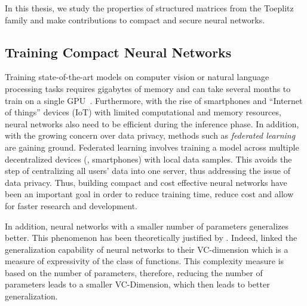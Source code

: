 In this thesis, we study the properties of structured matrices from the Toeplitz family and make contributions to compact and secure neural networks.

\subsection{Training Compact Neural Networks}
\label{subsection:ch1-training_compact_neural_networks}

Training state-of-the-art models on computer vision or natural language processing tasks requires gigabytes of memory and can take several months to train on a single GPU~\cite{krizhevsky2012imagenet,brown2020language}.
Furthermore, with the rise of smartphones and ``Internet of things'' devices (IoT) with limited computational and memory resources, neural networks also need to be efficient during the inference phase.
In addition, with the growing concern over data privacy, methods such as \emph{federated learning} are gaining ground.
Federated learning involves training a model across multiple decentralized devices (\eg, smartphones) with local data samples. 
This avoids the step of centralizing all users' data into one server, thus addressing the issue of data privacy.  
Thus, building compact and cost effective neural networks have been an important goal in order to reduce training time, reduce cost and allow for faster research and development.



In addition, neural networks with a smaller number of parameters generalizes better. 
This phenomenon has been theoretically justified by \citet{vapnik1982estimation}.
Indeed, \citeauthor{vapnik1982estimation} linked the generalization capability of neural networks to their VC-dimension which is a measure of expressivity of the class of functions.
This complexity measure is based on the number of parameters, therefore, reducing the number of parameters leads to a smaller VC-Dimension, which then leads to better generalization.

